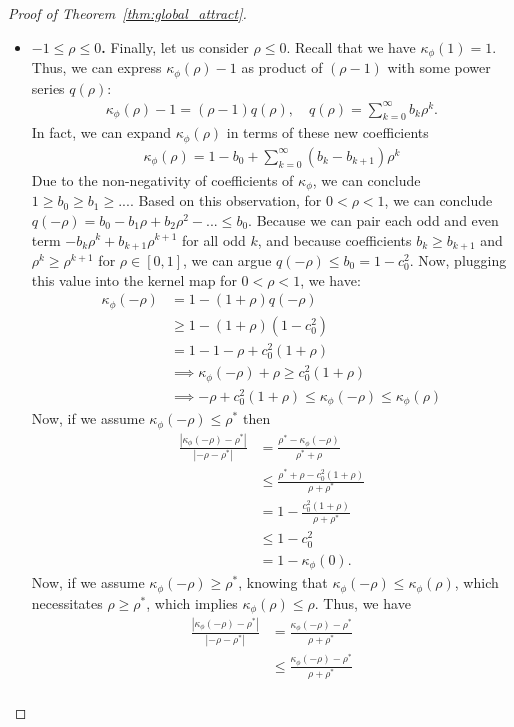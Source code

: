 \documentclass[twoside]{article}
\newcommand{\km}{\kappa_\phi}
\theoremstyle{definition}
\begin{document}
\begin{proof}[Proof of Theorem~\ref{thm:global_attract}]
\begin{itemize}
\item \textbf{$-1 \le \rho \le 0$.}
Finally, let us consider $\rho \le 0$. 
Recall that we have $\km(1) = 1$. Thus, we can express $\km(\rho)-1$ as product of $(\rho-1)$ with some power series $q(\rho)$:
\begin{align*}
\km(\rho) - 1 = (\rho-1)q(\rho), \quad q(\rho) = \sum_{k=0}^\infty b_k \rho^k.
\end{align*}
In fact, we can expand $\km(\rho)$ in terms of these new coefficients
\begin{align*}
\km(\rho) = 1-b_0 + \sum_{k=0}^\infty (b_k - b_{k+1}) \rho^k
\end{align*}
Due to the non-negativity of coefficients of $\km$, we can conclude $1\ge b_0 \ge b_1 \ge ...$. Based on this observation, for $0 < \rho < 1$, we can conclude
$q(-\rho) = b_0 - b_1 \rho + b_2 \rho^2 - ... \le b_0$. Because we can pair each odd and even term $-b_{k}\rho^k + b_{k+1} \rho^{k+1}$ for all odd $k$, and because coefficients $b_k \ge b_{k+1}$ and $\rho^{k} \ge \rho^{k+1}$ for $\rho \in [0,1]$, we can argue $q(-\rho) \le b_0 = 1 - c_0^2$. Now, plugging this value into the kernel map for $0 < \rho < 1$, we have:
\begin{align*}
\km(-\rho) &= 1 - (1+\rho)q(-\rho) \\
&\ge 1-(1+\rho)(1-c_0^2)\\
&= 1 - 1 - \rho + c_0^2 (1+\rho)\\
&\implies \km(-\rho) + \rho \ge c_0^2 (1+\rho)\\
&\implies -\rho + c_0^2(1+\rho) \le \km(-\rho) \le \km(\rho)
\end{align*}
Now, if we assume $\km(-\rho) \le \rho^*$ then
\begin{align*}
\frac{|\km(-\rho)-\rho^*|}{|-\rho-\rho^*|}&=\frac{\rho^* - \km(-\rho)}{\rho^* + \rho} \\
&\le \frac{\rho^* + \rho - c_0^2 (1+\rho)}{\rho+\rho^*} \\
&= 1- \frac{c_0^2(1+\rho)}{\rho+\rho^*} \\
&\le 1-c_0^2\\
&= 1 - \km(0).
\end{align*}
Now, if we assume $\km(-\rho) \ge \rho^*$, knowing that $\km(-\rho)\le \km(\rho)$, which necessitates $\rho\ge \rho^*$, which implies $\km(\rho)\le \rho$. Thus, we have
\begin{align*}
\frac{|\km(-\rho)-\rho^*|}{|-\rho-\rho^*|} &= \frac{\km(-\rho)-\rho^*}{\rho+\rho^*}\\
&\le \frac{\km(-\rho)-\rho^*}{\rho+\rho^*} \\

\end{align*}
\end{itemize}
\end{proof}
\end{document}

